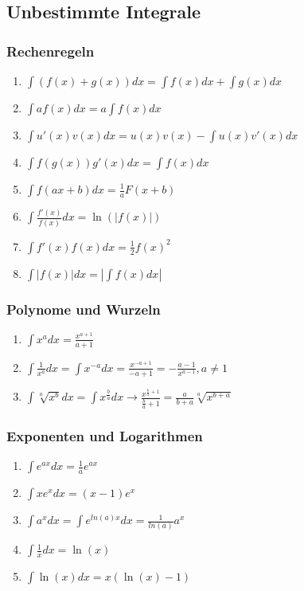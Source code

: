 \documentclass[a4paper, 9pt, DIV=24]{scrartcl}
\begin{document}
\subsection{Unbestimmte Integrale}
\subsubsection{Rechenregeln}
\begin{enumerate}[label={(}\arabic*{)}]
 \item $\int(f(x)+g(x))dx = \int f(x)dx + \int g(x)dx$
 \item $\int af(x)dx = a\int f(x)dx$
 \item $\int u'(x)v(x)dx = u(x)v(x) - \int u(x)v'(x)dx$
 \item $\int f(g(x))g'(x)dx = \int f(x)dx$
 \item $\int f(ax+b)dx = \frac{1}{a}F(x+b)$
 \item $\int \frac{f'(x)}{f(x)}dx = \ln(|f(x)|)$
 \item $\int f'(x)f(x)dx = \frac{1}{2}f(x)^2$
 \item $\int |f(x)|dx = |\int f(x)dx|$
\end{enumerate}
\subsubsection{Polynome und Wurzeln}
\begin{enumerate}[label={(}\arabic*{)}]
 \item $\int x^a dx = \frac{x^{a+1}}{a+1}$
 \item $\int \frac{1}{x^a} dx = \int x^{-a} dx = \frac{x^{-a+1}}{-a+1} = -\frac{a-1}{x^{a-1}}, a \neq 1$
 \item $\int \sqrt[a]{x^b} dx = \int x^{\frac{b}{a}} dx \rightarrow \frac{x^{\frac{b}{a}+1}}{\frac{b}{a}+1} = \frac{a}{b+a}\sqrt[a]{x^{b+a}}$
\end{enumerate}
\subsubsection{Exponenten und Logarithmen}
\begin{enumerate}[label={(}\arabic*{)}]
 \item $\int e^{ax} dx = \frac{1}{a}e^{ax}$
 \item $\int xe^{x} dx = (x-1)e^{x}$
 \item $\int a^{x} dx = \int e^{ln(a)x} dx = \frac{1}{ln(a)}a^x$
 \item $\int \frac{1}{x} dx = \ln(x)$
 \item $\int \ln(x) dx = x(\ln(x)-1)$
\end{enumerate}
\end{document}
